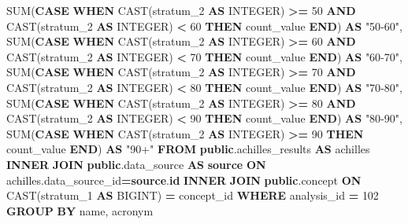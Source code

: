 \documentclass[
]{book}
\newenvironment{Shaded}{\begin{snugshade}}{\end{snugshade}}
\newcommand{\ControlFlowTok}[1]{\textcolor[rgb]{0.13,0.29,0.53}{\textbf{#1}}}
\newcommand{\DataTypeTok}[1]{\textcolor[rgb]{0.13,0.29,0.53}{#1}}
\newcommand{\DecValTok}[1]{\textcolor[rgb]{0.00,0.00,0.81}{#1}}
\newcommand{\FunctionTok}[1]{\textcolor[rgb]{0.00,0.00,0.00}{#1}}
\newcommand{\KeywordTok}[1]{\textcolor[rgb]{0.13,0.29,0.53}{\textbf{#1}}}
\newcommand{\NormalTok}[1]{#1}
\newcommand{\OperatorTok}[1]{\textcolor[rgb]{0.81,0.36,0.00}{\textbf{#1}}}
\newcommand{\OtherTok}[1]{\textcolor[rgb]{0.56,0.35,0.01}{#1}}
\begin{document}
\begin{Shaded}
\begin{Highlighting}[]
       \FunctionTok{SUM}\NormalTok{(}\ControlFlowTok{CASE} \ControlFlowTok{WHEN} \FunctionTok{CAST}\NormalTok{(stratum\_2 }\KeywordTok{AS} \DataTypeTok{INTEGER}\NormalTok{) }\OperatorTok{\textgreater{}=} \DecValTok{50} \KeywordTok{AND} \FunctionTok{CAST}\NormalTok{(stratum\_2 }\KeywordTok{AS} \DataTypeTok{INTEGER}\NormalTok{) }\OperatorTok{\textless{}} \DecValTok{60} \ControlFlowTok{THEN}\NormalTok{ count\_value }\ControlFlowTok{END}\NormalTok{) }\KeywordTok{AS} \OtherTok{"50{-}60"}\NormalTok{,}
       \FunctionTok{SUM}\NormalTok{(}\ControlFlowTok{CASE} \ControlFlowTok{WHEN} \FunctionTok{CAST}\NormalTok{(stratum\_2 }\KeywordTok{AS} \DataTypeTok{INTEGER}\NormalTok{) }\OperatorTok{\textgreater{}=} \DecValTok{60} \KeywordTok{AND} \FunctionTok{CAST}\NormalTok{(stratum\_2 }\KeywordTok{AS} \DataTypeTok{INTEGER}\NormalTok{) }\OperatorTok{\textless{}} \DecValTok{70} \ControlFlowTok{THEN}\NormalTok{ count\_value }\ControlFlowTok{END}\NormalTok{) }\KeywordTok{AS} \OtherTok{"60{-}70"}\NormalTok{,}
       \FunctionTok{SUM}\NormalTok{(}\ControlFlowTok{CASE} \ControlFlowTok{WHEN} \FunctionTok{CAST}\NormalTok{(stratum\_2 }\KeywordTok{AS} \DataTypeTok{INTEGER}\NormalTok{) }\OperatorTok{\textgreater{}=} \DecValTok{70} \KeywordTok{AND} \FunctionTok{CAST}\NormalTok{(stratum\_2 }\KeywordTok{AS} \DataTypeTok{INTEGER}\NormalTok{) }\OperatorTok{\textless{}} \DecValTok{80} \ControlFlowTok{THEN}\NormalTok{ count\_value }\ControlFlowTok{END}\NormalTok{) }\KeywordTok{AS} \OtherTok{"70{-}80"}\NormalTok{,}
       \FunctionTok{SUM}\NormalTok{(}\ControlFlowTok{CASE} \ControlFlowTok{WHEN} \FunctionTok{CAST}\NormalTok{(stratum\_2 }\KeywordTok{AS} \DataTypeTok{INTEGER}\NormalTok{) }\OperatorTok{\textgreater{}=} \DecValTok{80} \KeywordTok{AND} \FunctionTok{CAST}\NormalTok{(stratum\_2 }\KeywordTok{AS} \DataTypeTok{INTEGER}\NormalTok{) }\OperatorTok{\textless{}} \DecValTok{90} \ControlFlowTok{THEN}\NormalTok{ count\_value }\ControlFlowTok{END}\NormalTok{) }\KeywordTok{AS} \OtherTok{"80{-}90"}\NormalTok{,}
       \FunctionTok{SUM}\NormalTok{(}\ControlFlowTok{CASE} \ControlFlowTok{WHEN} \FunctionTok{CAST}\NormalTok{(stratum\_2 }\KeywordTok{AS} \DataTypeTok{INTEGER}\NormalTok{) }\OperatorTok{\textgreater{}=} \DecValTok{90} \ControlFlowTok{THEN}\NormalTok{ count\_value }\ControlFlowTok{END}\NormalTok{) }\KeywordTok{AS} \OtherTok{"90+"}
\KeywordTok{FROM} \KeywordTok{public}\NormalTok{.achilles\_results }\KeywordTok{AS}\NormalTok{ achilles}
\KeywordTok{INNER} \KeywordTok{JOIN} \KeywordTok{public}\NormalTok{.data\_source }\KeywordTok{AS} \KeywordTok{source} \KeywordTok{ON}\NormalTok{ achilles.data\_source\_id}\OperatorTok{=}\KeywordTok{source}\NormalTok{.}\KeywordTok{id}
\KeywordTok{INNER} \KeywordTok{JOIN} \KeywordTok{public}\NormalTok{.concept }\KeywordTok{ON} \FunctionTok{CAST}\NormalTok{(stratum\_1 }\KeywordTok{AS}\NormalTok{ BIGINT) }\OperatorTok{=}\NormalTok{ concept\_id}
\KeywordTok{WHERE}\NormalTok{ analysis\_id }\OperatorTok{=} \DecValTok{102}
\KeywordTok{GROUP} \KeywordTok{BY}\NormalTok{ name, acronym}
\end{Highlighting}
\end{Shaded}
\end{document}
